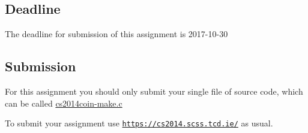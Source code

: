 \subsection*{Deadline}

The deadline for submission of this assignment is 2017-\/10-\/30

\subsection*{Submission}

For this assignment you should only submit your single file of source code, which can be called {\ttfamily \hyperlink{cs2014coin-make_8c}{cs2014coin-\/make.\+c}}

To submit your assignment use \href{https://cs2014.scss.tcd.ie/}{\tt https\+://cs2014.\+scss.\+tcd.\+ie/} as usual. 
